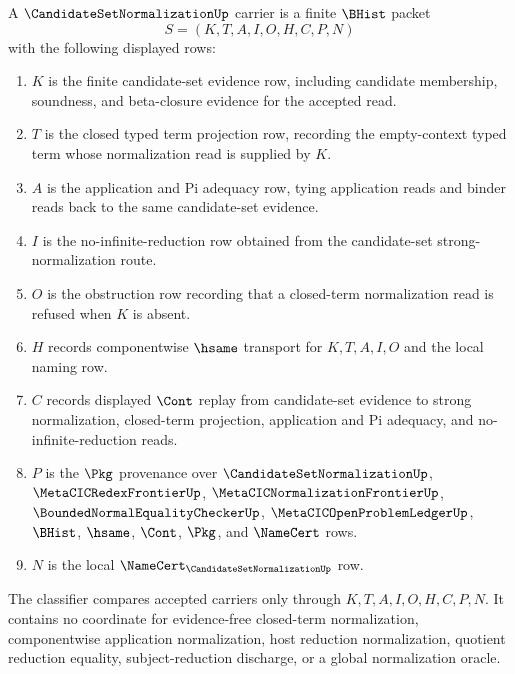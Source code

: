 \begin{definition}
\label{def:metacic-candidate-set-normalization-carrier}
A $\CandidateSetNormalizationUp$ carrier is a finite $\BHist$ packet
$$
S=(K,T,A,I,O,H,C,P,N)
$$
with the following displayed rows:
\begin{enumerate}
\item $K$ is the finite candidate-set evidence row, including candidate membership, soundness, and beta-closure evidence for the accepted read.
\item $T$ is the closed typed term projection row, recording the empty-context typed term whose normalization read is supplied by $K$.
\item $A$ is the application and Pi adequacy row, tying application reads and binder reads back to the same candidate-set evidence.
\item $I$ is the no-infinite-reduction row obtained from the candidate-set strong-normalization route.
\item $O$ is the obstruction row recording that a closed-term normalization read is refused when $K$ is absent.
\item $H$ records componentwise $\hsame$ transport for $K,T,A,I,O$ and the local naming row.
\item $C$ records displayed $\Cont$ replay from candidate-set evidence to strong normalization, closed-term projection, application and Pi adequacy, and no-infinite-reduction reads.
\item $P$ is the $\Pkg$ provenance over $\CandidateSetNormalizationUp$, $\MetaCICRedexFrontierUp$, $\MetaCICNormalizationFrontierUp$, $\BoundedNormalEqualityCheckerUp$, $\MetaCICOpenProblemLedgerUp$, $\BHist$, $\hsame$, $\Cont$, $\Pkg$, and $\NameCert$ rows.
\item $N$ is the local $\NameCert_{\CandidateSetNormalizationUp}$ row.
\end{enumerate}
The classifier compares accepted carriers only through $K,T,A,I,O,H,C,P,N$. It contains no coordinate for evidence-free closed-term normalization, componentwise application normalization, host reduction normalization, quotient reduction equality, subject-reduction discharge, or a global normalization oracle.
\end{definition}

